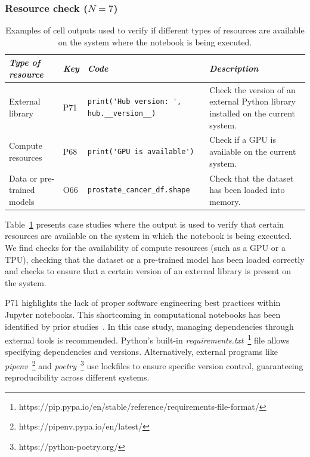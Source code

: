 \subsubsection{Resource check ($N = 7$)}\label{sec:implicit-resource-check}

\begin{table}
\centering
\caption{Examples of cell outputs used to verify if different types of resources are available on the system where the notebook is being executed.}
\begin{tabular}{@{}m{} m{} m{} m{}@{}}
\toprule
\emph{\textbf{Type of resource}}&
\emph{\textbf{Key}}&
\emph{\textbf{Code}}&
\emph{\textbf{Description}}\\
\midrule

External library&
P71&
\begin{lstlisting}
print('Hub version: ', hub.__version__)
\end{lstlisting}&
Check the version of an external Python library installed on the current system.\\

Compute resources&
P68&
\begin{lstlisting}
print('GPU is available')
\end{lstlisting}&
Check if a GPU is available on the current system.\\

Data or pre-trained models&
O66&
\begin{lstlisting}
prostate_cancer_df.shape
\end{lstlisting}&
Check that the dataset has been loaded into memory.\\
\bottomrule
\end{tabular}
\label{tab:resource-check}
\end{table}

Table~\ref{tab:resource-check} presents case studies where the output is used to verify that certain resources are available on the system in which the notebook is being executed. We find checks for the availability of compute resources (such as a GPU or a TPU), checking that the dataset or a pre-trained model has been loaded correctly and checks to ensure that a certain version of an external library is present on the system.

P71 highlights the lack of proper software engineering best practices within Jupyter notebooks. This shortcoming in computational notebooks has been identified by prior studies~\cite{quaranta2021kgtorrent, pimentel2019large-scale}. In this case study, managing dependencies through external tools is recommended. Python's built-in \emph{requirements.txt}~\footnote{https://pip.pypa.io/en/stable/reference/requirements-file-format/} file allows specifying dependencies and versions. Alternatively, external programs like \emph{pipenv}~\footnote{https://pipenv.pypa.io/en/latest/} and \emph{poetry}~\footnote{https://python-poetry.org/} use lockfiles to ensure specific version control, guaranteeing reproducibility across different systems. 

